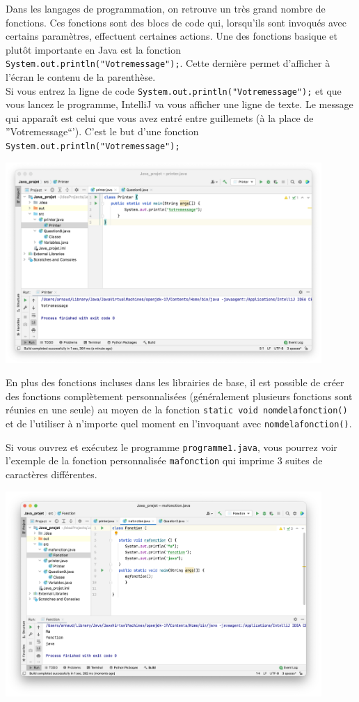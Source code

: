 Dans les langages de programmation, on retrouve un très grand nombre de fonctions. Ces fonctions sont des blocs de code qui, lorsqu'ils sont invoqués avec certains paramètres, effectuent certaines actions. Une des fonctions basique et plutôt importante en Java est la fonction \lstinline{System.out.println("Votremessage");}.  Cette dernière permet d'afficher à l'écran le contenu de la parenthèse.\\ 
Si vous entrez la ligne de code \lstinline{System.out.println("Votremessage");} et que vous lancez le programme, IntelliJ va vous afficher une ligne de texte. Le message qui apparaît est celui que vous avez entré entre guillemets (à la place de ''Votremessage``'). C'est le but d'une fonction \lstinline{System.out.println("Votremessage");}
\begin{center}
\includegraphics[width=12cm]{9j}	
\end{center}


En plus des fonctions incluses dans les librairies de base, il est possible de créer des fonctions complètement personnalisées (généralement plusieurs fonctions sont réunies en une seule) au moyen de la fonction \lstinline{static void nomdelafonction() } et de l'utiliser à n'importe quel moment en l'invoquant avec \lstinline{nomdelafonction()}.

Si vous ouvrez et exécutez le programme \lstinline{programme1.java}, vous pourrez voir l'exemple de la fonction personnalisée \lstinline{mafonction} qui imprime 3 suites de caractères différentes.

\begin{center}
\includegraphics[width=12cm]{10j}		
\end{center}


